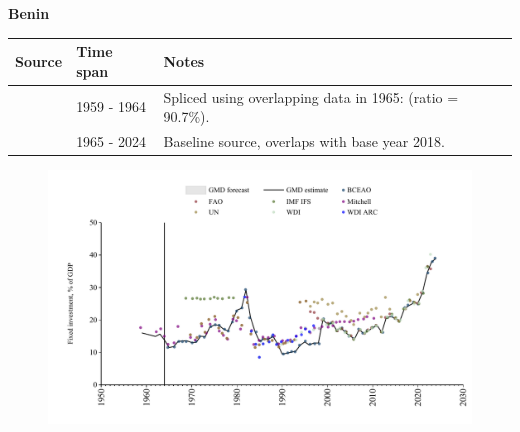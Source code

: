 \documentclass[12pt,a4paper,landscape]{article}
\begin{document}
\begin{adjustbox}{max totalsize={\paperwidth}{\paperheight},center}
\begin{minipage}[t][\textheight][t]{\textwidth}
\vspace*{0.5cm}
{}
\begin{center}
{\Large\bfseries Benin}
\end{center}
\vspace{0.5cm}
\begin{table}[H]
\centering
\small
\begin{tabular}{|l|l|l|}
\hline
\textbf{Source} & \textbf{Time span} & \textbf{Notes} \\
\hline
\rowcolor{white}\cite{Mitchell}& 1959 - 1964 &Spliced using overlapping data in 1965: (ratio = 90.7\%).\\
\rowcolor{lightgray}\cite{BCEAO}& 1965 - 2024 &Baseline source, overlaps with base year 2018.\\
\hline
\end{tabular}
\end{table}
\begin{figure}[H]
\centering
\includegraphics[width=\textwidth,height=0.6\textheight,keepaspectratio]{graphs/BEN_finv_GDP.pdf}
\end{figure}
\end{minipage}
\end{adjustbox}
\end{document}
